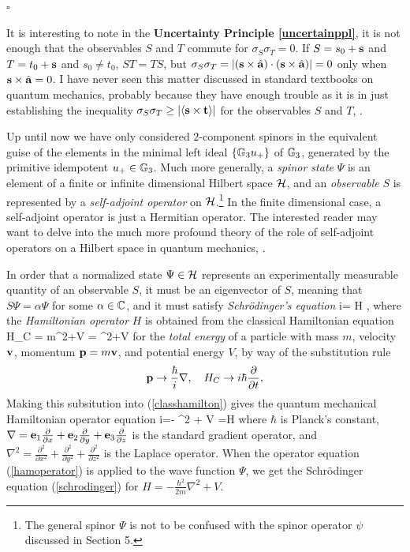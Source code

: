 \documentclass[]{article}
\begin{document}
\hfill $\square$

It is interesting to note in the {\bf Uncertainty Principle \ref{uncertainppl}}, it is not enough that the observables $S$ and $T$ 
commute for $\sigma_S \sigma_T=0$. If $S= s_0+\mathbf{s}$ and $T=t_0 + \mathbf{s}$ and $s_0\ne t_0$, $ST=TS$, but
$\sigma_S \sigma_T = |(\mathbf{s} \times \hat {\mathbf{a}})\cdot (\mathbf{s} \times \hat {\mathbf{a}})|=0$ only when $\mathbf{s} \times \hat {\mathbf{a}}=0$.
I have never seen this matter discussed in standard textbooks on quantum mechanics, probably because 
they have enough trouble as it is in just establishing the inequality  $\sigma_S \sigma_T\ge |\langle \mathbf{s}\times \mathbf{t}\rangle|$ 
for the observables $S$ and $T$, \cite[p.108]{G95}.

Up until now we have only considered $2$-component spinors in the equivalent guise of the elements in the minimal left ideal $\{\mathbb{G}_3 u_+\}$ of $\mathbb{G}_3$,
 generated by the primitive idempotent $u_+\in \mathbb{G}_3$. Much more generally, 
 a {\it spinor state} $\Psi$ is an element of a finite or infinite dimensional Hilbert 
space ${\cal H}$, and an {\it observable} $S$ is represented by a {\it self-adjoint operator} on $\cal H$.\footnote{The general spinor 
$\Psi$ is not to be confused with the spinor operator $\psi$ discussed in Section 5.}
In the finite dimensional case, a self-adjoint operator is just a Hermitian operator. The interested reader may want to delve into the much more profound theory of the
role of self-adjoint operators on a Hilbert space in quantum mechanics, \cite{mitocw,wikiHilbert}.

In order that a normalized state $\Psi\in \cal H$ represents an experimentally measurable quantity of an observable $S$, it must be an eigenvector
of $S$, meaning that $S \Psi = \alpha \Psi$ for some $\alpha \in \mathbb{C}$, and it must satisfy {\it Schr\"odinger's equation}
\beq i\hbar {}= H \Psi ,\label{schrodinger} \eeq
where the {\it Hamiltonian operator} $H$ is obtained from the classical Hamiltonian equation
\beq H_C = m\bv^2+V =  \bp^2+V \label{classhamilton} \eeq
for the {\it total energy} of a particle with mass $m$, velocity $\mathbf{v}$, momentum $\mathbf{p}=m\mathbf{v}$, and potential energy $V$, by way of
the substitution rule
\[ \mathbf{p} \to \frac{\hbar}{i}\nabla, \quad H_C \to i\hbar \frac{\partial}{\partial t},\]
Making this subsitution into (\ref{classhamilton}) gives the quantum mechanical Hamiltonian operator equation
\beq i\hbar {}=- \nabla^2 + V =H \label{hamoperator} \eeq
where $\hbar$ is Planck's constant, $\nabla = \mathbf{e}_1 \frac{\partial}{\partial x}+ \mathbf{e}_2 \frac{\partial}{\partial y}+ \mathbf{e}_3 \frac{\partial}{\partial z}$ is
the standard gradient operator, and $\nabla^2 = \frac{\partial^2}{\partial x^2}+ \frac{\partial^2}{\partial y^2}+ \frac{\partial^2}{\partial z^2}$
is the Laplace operator. When the operator equation (\ref{hamoperator}) is applied to the wave function $\Psi$, we
get the Schr\"odinger equation (\ref{schrodinger}) for $H=-\frac{\hbar^2}{2m} \nabla^2 + V $.
\end{document}
